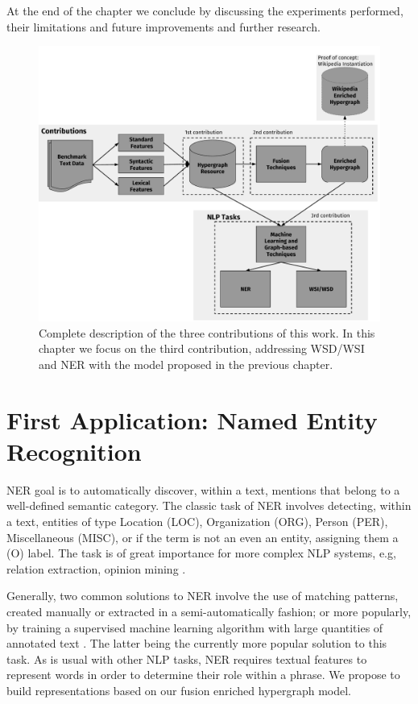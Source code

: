 At the end of the chapter we conclude by discussing the experiments performed, their limitations and  future improvements and further research. 

\begin{figure}
\centering
\includegraphics[width=.9\linewidth]{images/Chapitre4/main_diag2.pdf}
\caption{Complete description of the three contributions of this work. In this chapter we focus on the third contribution, addressing WSD/WSI and NER with the model proposed in the previous chapter.}
\label{fig:main_diag2}
\end{figure}

\section{First Application: Named Entity Recognition}
\label{sec:ner}


 NER goal is to automatically discover, within a text, mentions that belong to a well-defined semantic category. The classic task of NER involves detecting, within a text, entities of type Location (LOC), Organization (ORG), Person (PER), Miscellaneous (MISC), or if the term is not an even an entity, assigning them a (O) label. The task is of great importance for more complex NLP systems, e.g, relation extraction, opinion mining \cite{nadeau2007survey}.  
 
 Generally, two common solutions to NER involve the use of matching patterns, created manually or extracted in a semi-automatically fashion\cite{gupta2015distantly}; or more popularly, by training a supervised machine learning algorithm with large quantities of annotated text \cite{mining12Book} . The latter being the currently more popular solution to this task. As is usual with other NLP tasks, NER  requires textual features to represent words in order to determine their role within a phrase. We propose to build representations based on our fusion enriched hypergraph model.


